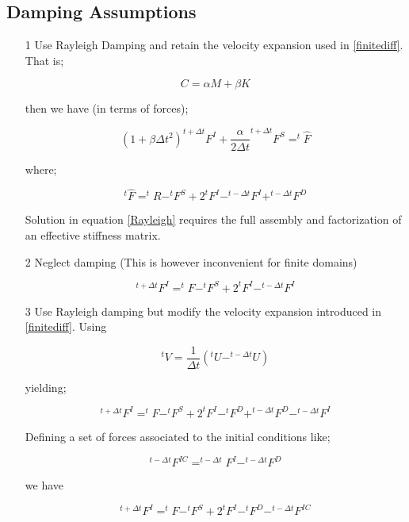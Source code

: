 \subsection{Damping Assumptions}

\begin{itemize}
\item[1] Use Rayleigh Damping and retain the velocity expansion used in \eqref{finitediff}. That is;

\begin{equation}
C=\alpha M+\beta K
\end{equation}

then we have (in terms of forces);

\begin{equation}
(1+\beta \Delta t^2) ^{t+\Delta t}F^I+\dfrac{\alpha}{2\Delta t} ^{t+\Delta t}F^S=^{t}\hat{F}
\label{Rayleigh}
\end{equation}

where;

\[
^{t}\hat{F}=^{t}R-^{t}F^S+2 ^{t}F^I-^{t-\Delta t}F^I+^{t-\Delta t}F^D
\]

Solution in equation \eqref{Rayleigh} requires the full assembly and factorization of an effective stiffness matrix.

\item[2] Neglect damping (This is however inconvenient for finite domains) 


\begin{equation}
^{t+\Delta t}F^I=^{t}F-^{t}F^S+2 ^{t}F^I-^{t-\Delta t}F^I
\label{Nodamping}
\end{equation}

\item[3] Use Rayleigh damping but modify the velocity expansion introduced in \eqref{finitediff}. Using

\begin{equation}
^{t}V=\dfrac{1}{\Delta t}(^{t}U-^{t-\Delta t}U)
\label{velocity}
\end{equation}

yielding;

\begin{equation}
^{t+\Delta t}F^I=^{t}F-^{t}F^S+2 ^{t}F^{I}-^{t}F^D+^{t-\Delta t}F^D-^{t-\Delta t}F^I
\end{equation}

Defining a set of forces associated to the initial conditions like;

\[
^{t-\Delta t}F^{IC}=^{t-\Delta t}F^I-^{t-\Delta t}F^D
\]

we have

\begin{equation}
^{t+\Delta t}F^I=^{t}F-^{t}F^S+2 ^{t}F^{I}-^{t}F^D-^{t-\Delta t}F^{IC}
\label{modvelocity}
\end{equation}

\end{itemize}


